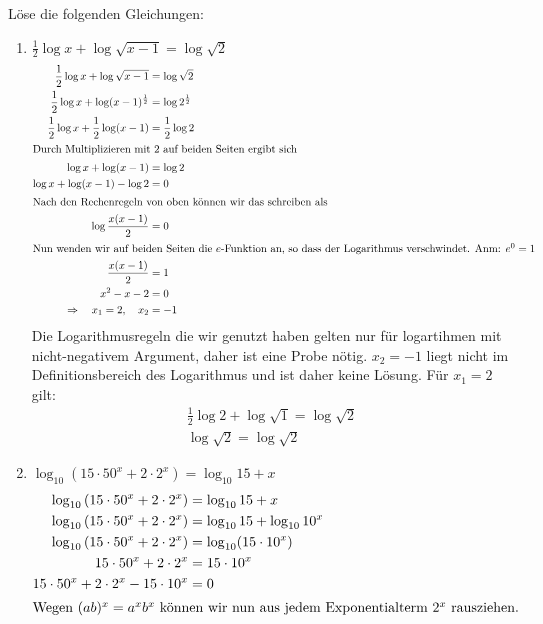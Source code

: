 \documentclass[11pt, a4paper]{article}
\newcommand\braces[1]{\left(#1\right)}
\begin{document}
Löse die folgenden Gleichungen:
\begin{enumerate}
	\item $\frac{1}{2} \log x + \log \sqrt{x-1} = \log \sqrt{2}$
		\begin{align*}
			\frac{1}{2} \log x + \log \sqrt{x-1} &= \log \sqrt{2} \\
			\frac{1}{2} \log x + \log (x-1)^\frac{1}{2} &= \log 2^\frac{1}{2} \\
			\frac{1}{2} \log x + \frac{1}{2} \log (x-1) &= \frac{1}{2} \log 2 \\
			\intertext{Durch Multiplizieren mit 2 auf beiden Seiten ergibt sich}
			\log x + \log (x-1) &= \log 2 \\
			\log x + \log (x-1) - \log 2 &= 0 \\
			\intertext{Nach den Rechenregeln von oben können wir das schreiben als}
			\log \frac{x (x-1)}{2} &= 0 \\
			\intertext{Nun wenden wir auf beiden Seiten die $e$-Funktion an, so dass der Logarithmus verschwindet. Anm: $e^0 = 1$}
			\frac{x (x-1)}{2} &= 1 \\
			x^2 - x - 2 &= 0 \\
			\Rightarrow \quad x_1 = 2, \quad x_2 &= -1
		\end{align*}
		Die Logarithmusregeln die wir genutzt haben gelten nur für logartihmen mit nicht-negativem Argument, daher ist eine Probe nötig. $x_2 = -1$ liegt nicht im Definitionsbereich des Logarithmus und ist daher keine Lösung. Für $x_1 = 2$ gilt: \\
		\begin{align*}
			\frac{1}{2} \log 2 + \log \sqrt{1} = \log \sqrt{2} \\
			\log \sqrt{2} = \log \sqrt{2}
		\end{align*}
	\item $\log_{10} \braces{15 \cdot 50^x + 2 \cdot 2^x} = \log_{10} 15 + x$
		\begin{align*}
			\log_{10} \braces{15 \cdot 50^x + 2 \cdot 2^x} &= \log_{10} 15 + x \\
			\log_{10} \braces{15 \cdot 50^x + 2 \cdot 2^x} &= \log_{10} 15 + \log_{10} 10^x \\
			\log_{10} \braces{15 \cdot 50^x + 2 \cdot 2^x} &= \log_{10} (15 \cdot 10^x) \\
			15 \cdot 50^x + 2 \cdot 2^x &= 15 \cdot 10^x \\
			15 \cdot 50^x + 2 \cdot 2^x - 15 \cdot 10^x &= 0 \\
			\intertext{Wegen $(ab)^x = a^x b^x$ können wir nun aus jedem Exponentialterm $2^x$ rausziehen.}

\end{align*}
\end{enumerate}
\end{document}

